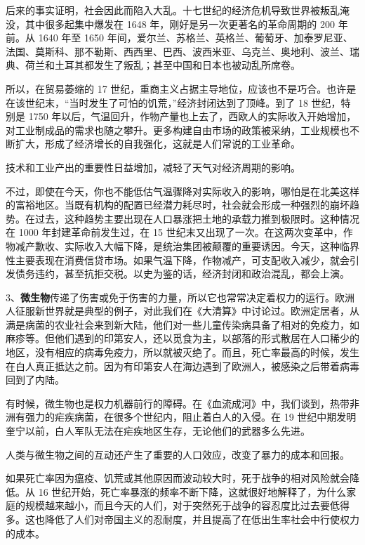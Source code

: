 后来的事实证明，社会因此而陷入大乱。十七世纪的经济危机导致世界被叛乱淹没，其中很多起集中爆发在 1648 年，刚好是另一次更著名的革命周期的 200 年前。从 1640 年至 1650 年间，爱尔兰、苏格兰、英格兰、葡萄牙、加泰罗尼亚、法国、莫斯科、那不勒斯、西西里、巴西、波西米亚、乌克兰、奥地利、波兰、瑞典、荷兰和土耳其都发生了叛乱；甚至中国和日本也被动乱所席卷。

所以，在贸易萎缩的 17 世纪，重商主义占据主导地位，应该也不是巧合。也许是在该世纪末，“当时发生了可怕的饥荒，”经济封闭达到了顶峰。到了 18 世纪，特别是 1750 年以后，气温回升，作物产量也上去了，西欧人的实际收入开始增加，对工业制成品的需求也随之攀升。更多构建自由市场的政策被采纳，工业规模也不断扩大，形成了经济增长的自我强化，这就是人们常说的工业革命。

技术和工业产出的重要性日益增加，减轻了天气对经济周期的影响。

不过，即使在今天，你也不能低估气温骤降对实际收入的影响，哪怕是在北美这样的富裕地区。当既有机构的配置已经潜力耗尽时，社会就会形成一种强烈的崩坏趋势。在过去，这种趋势主要出现在人口暴涨把土地的承载力推到极限时。这种情况在 1000 年封建革命前发生过，在 15 世纪末又出现了一次。在这两次变革中，作物减产歉收、实际收入大幅下降，是统治集团被颠覆的重要诱因。今天，这种临界性主要表现在消费信贷市场。如果气温下降，作物减产，可支配收入减少，就会引发债务违约，甚至抗拒交税。以史为鉴的话，经济封闭和政治混乱，都会上演。

3、\textbf{微生物}传递了伤害或免于伤害的力量，所以它也常常决定着权力的运行。欧洲人征服新世界就是典型的例子，对此我们在《大清算》中讨论过。欧洲定居者，从满是病菌的农业社会来到新大陆，他们对一些儿童传染病具备了相对的免疫力，如麻疹等。但他们遇到的印第安人，还以觅食为主，以部落的形式散居在人口稀少的地区，没有相应的病毒免疫力，所以就被灭绝了。而且，死亡率最高的时候，发生在白人真正抵达之前。因为有印第安人在海边遇到了欧洲人，被感染之后带着病毒回到了内陆。

有时候，微生物也是权力机器前行的障碍。在《血流成河》中，我们谈到，热带非洲有强力的疟疾病菌，在很多个世纪内，阻止着白人的入侵。在 19 世纪中期发明奎宁以前，白人军队无法在疟疾地区生存，无论他们的武器多么先进。

人类与微生物之间的互动还产生了重要的人口效应，改变了暴力的成本和回报。

如果死亡率因为瘟疫、饥荒或其他原因而波动较大时，死于战争的相对风险就会降低。从 16 世纪开始，死亡率暴涨的频率不断下降，这就很好地解释了，为什么家庭的规模越来越小，而且今天的人们，对于突然死于战争的容忍度比过去要低得多。这也降低了人们对帝国主义的忍耐度，并且提高了在低出生率社会中行使权力的成本。

